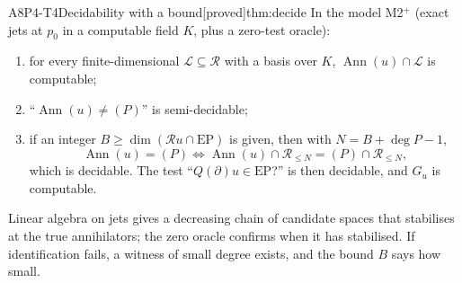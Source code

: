 \documentclass[11pt,a4paper,oneside]{report}
\newcommand{\badge}[2]{\textcolor{#1}{\textsf{\footnotesize[#2]}}}
\newcommand{\proved}{\badge{cC}{proved}}
\newcommand{\Ann}{\operatorname{Ann}}
\newcommand{\EP}{\mathrm{EP}}
\newcommand{\ring}{\mathcal{R}}
\DeclareMathOperator{\dimc}{dim}
\newenvironment{dimcard}[5]{\par\Needspace{12\baselineskip}\begin{dimcardbox}{#1}{#2}{#3}{#4}{#5}}{\end{dimcardbox}}
\begin{document}
\begin{dimcard}{A8}{P4-T4}{Decidability with a bound}{\proved}{thm:decide}
In the model M2$^+$ (exact jets at $p_0$ in a computable field $K$, plus a zero-test oracle):
\begin{enumerate}[label=(\roman*)]
\item for every finite-dimensional $\mathcal L\subseteq\ring$ with a basis over $K$, $\Ann(u)\cap\mathcal L$ is computable;
\item ``$\Ann(u)\ne(P)$'' is semi-decidable;
\item if an integer $B\ge\dimc(\ring u\cap\EP)$ is given, then with $N=B+\deg P-1$,
\[
\Ann(u)=(P)\iff\Ann(u)\cap\ring_{\le N}=(P)\cap\ring_{\le N},
\]
which is decidable. The test ``$Q(\partial)u\in\EP$?'' is then decidable, and $G_u$ is computable.
\end{enumerate}
\end{dimcard}

\begin{proofidea}
Linear algebra on jets gives a decreasing chain of candidate spaces that stabilises at the true annihilators; the zero oracle confirms when it has stabilised. If identification fails, a witness of small degree exists, and the bound $B$ says how small.
\end{proofidea}
\end{document}
